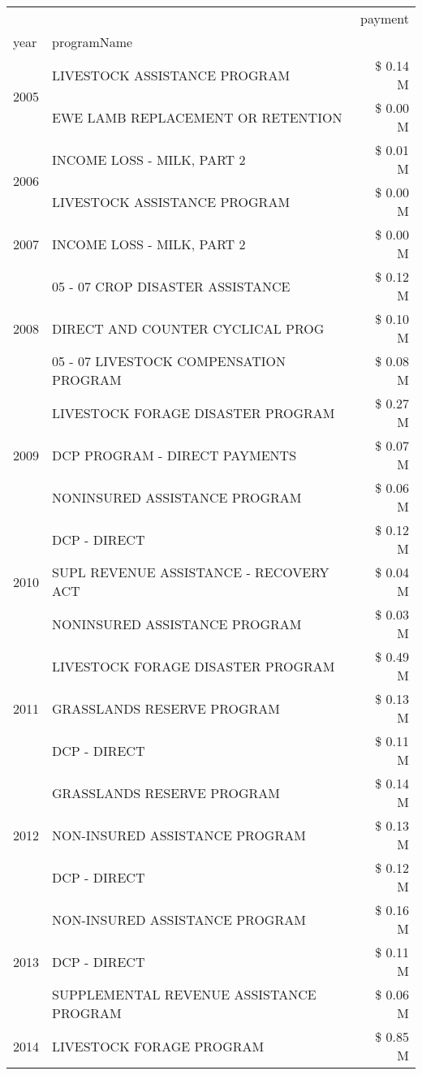 \begin{tabular}{llr}
\toprule
 &  & payment \\
year & programName &  \\
\midrule
\multirow[t]{2}{*}{2005} & LIVESTOCK ASSISTANCE PROGRAM & \$ 0.14 M \\
 & EWE LAMB REPLACEMENT OR RETENTION & \$ 0.00 M \\
\cline{1-3}
\multirow[t]{2}{*}{2006} & INCOME LOSS - MILK, PART 2 & \$ 0.01 M \\
 & LIVESTOCK ASSISTANCE PROGRAM & \$ 0.00 M \\
\cline{1-3}
2007 & INCOME LOSS - MILK, PART 2 & \$ 0.00 M \\
\cline{1-3}
\multirow[t]{3}{*}{2008} & 05 - 07 CROP DISASTER ASSISTANCE & \$ 0.12 M \\
 & DIRECT AND COUNTER CYCLICAL PROG & \$ 0.10 M \\
 & 05 - 07 LIVESTOCK COMPENSATION PROGRAM & \$ 0.08 M \\
\cline{1-3}
\multirow[t]{3}{*}{2009} & LIVESTOCK FORAGE DISASTER  PROGRAM & \$ 0.27 M \\
 & DCP PROGRAM - DIRECT PAYMENTS & \$ 0.07 M \\
 & NONINSURED ASSISTANCE PROGRAM & \$ 0.06 M \\
\cline{1-3}
\multirow[t]{3}{*}{2010} & DCP - DIRECT & \$ 0.12 M \\
 & SUPL REVENUE ASSISTANCE - RECOVERY ACT & \$ 0.04 M \\
 & NONINSURED ASSISTANCE PROGRAM & \$ 0.03 M \\
\cline{1-3}
\multirow[t]{3}{*}{2011} & LIVESTOCK FORAGE DISASTER PROGRAM & \$ 0.49 M \\
 & GRASSLANDS RESERVE PROGRAM & \$ 0.13 M \\
 & DCP - DIRECT & \$ 0.11 M \\
\cline{1-3}
\multirow[t]{3}{*}{2012} & GRASSLANDS RESERVE PROGRAM & \$ 0.14 M \\
 & NON-INSURED ASSISTANCE PROGRAM & \$ 0.13 M \\
 & DCP - DIRECT & \$ 0.12 M \\
\cline{1-3}
\multirow[t]{3}{*}{2013} & NON-INSURED ASSISTANCE PROGRAM & \$ 0.16 M \\
 & DCP - DIRECT & \$ 0.11 M \\
 & SUPPLEMENTAL REVENUE ASSISTANCE PROGRAM & \$ 0.06 M \\
\cline{1-3}
\multirow[t]{3}{*}{2014} & LIVESTOCK FORAGE PROGRAM & \$ 0.85 M \\

\end{tabular}
